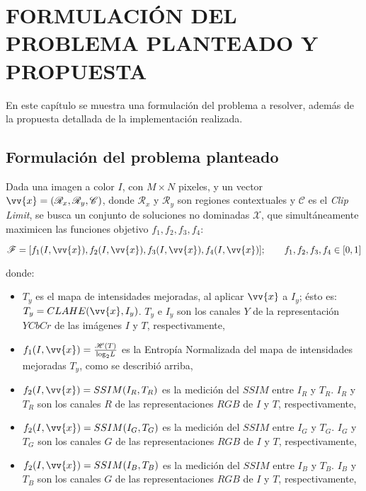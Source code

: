 \chapter{FORMULACIÓN DEL PROBLEMA PLANTEADO Y PROPUESTA}
\label{sec:proposal}

En este capítulo se muestra una formulación del problema a resolver, además de la propuesta detallada de la implementación realizada.

\section{Formulación del problema planteado}\label{sec:formulation}

Dada una imagen a color $I$, con $M \times N$ pixeles, y un vector $\vv{x}=(\mathscr{R}_x,\mathscr{R}_y,\mathscr{C})$, donde $\mathscr{R}_x$ y $\mathscr{R}_y$ son regiones contextuales y $\mathscr{C}$ es el \textit{Clip Limit}, se busca un conjunto de soluciones no dominadas $\mathscr{X}$, que simultáneamente maximicen las funciones objetivo $f_1,f_2,f_3,f_4$:


\begin{equation}
\mathscr{F} = [f_1(I,\vv{x}),f_2(I,\vv{x}),f_3(I,\vv{x}),f_4(I,\vv{x})]; \qquad f_1,f_2,f_3,f_4 \in [0,1]
\end{equation}

donde:


\begin{itemize}
	\item $T_y$ es el mapa de intensidades mejoradas, al aplicar $\vv{x}$ a $I_y$; ésto es: $T_y=CLAHE(\vv{x},I_y)$. $T_y$ e $I_y$ son los canales $Y$ de la representación $YCbCr$  de las imágenes $I$ y $T$, respectivamente,
	\item $f_1(I,\vv{x})=\frac{\mathscr{H}(T)}{\text{log}_2L}$ es la Entropía Normalizada del mapa de intensidades mejoradas $T_y$, como se describió arriba,
	\item $f_2(I,\vv{x})=SSIM(I_R,T_R)$ es la medición del $SSIM$ entre $I_R$ y $T_R$. $I_R$ y $T_R$ son los canales $R$ de las representaciones $RGB$ de $I$ y $T$, respectivamente,
	\item $f_2(I,\vv{x})=SSIM(I_G,T_G)$ es la medición del $SSIM$ entre $I_G$ y $T_G$. $I_G$ y $T_G$ son los canales $G$ de las representaciones $RGB$ de $I$ y $T$, respectivamente,
	\item $f_2(I,\vv{x})=SSIM(I_B,T_B)$ es la medición del $SSIM$ entre $I_B$ y $T_B$. $I_B$ y $T_B$ son los canales $G$ de las representaciones $RGB$ de $I$ y $T$, respectivamente,
\end{itemize}

